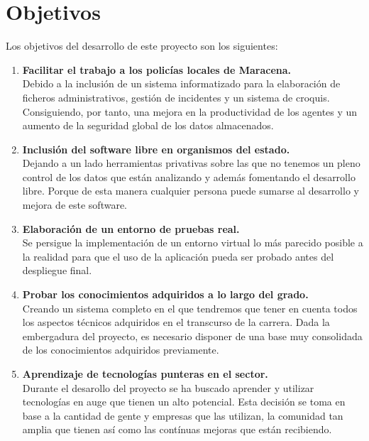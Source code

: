 \chapter{Objetivos}
Los objetivos del desarrollo de este proyecto son los siguientes:
\begin{enumerate}
    \item \textbf{Facilitar el trabajo a los policías locales de Maracena.}\\
    Debido a la inclusión de un sistema informatizado para la elaboración de 
    ficheros administrativos, gestión de incidentes y un sistema de croquis. Consiguiendo,
    por tanto, una mejora en la productividad de los agentes y un aumento de la seguridad
    global de los datos almacenados.
    
    \item \textbf{Inclusión del software libre en organismos del estado.}\\
    Dejando a un lado herramientas privativas sobre las que no tenemos un pleno control
    de los datos que están analizando y además fomentando el desarrollo libre. Porque 
    de esta manera cualquier persona puede sumarse al desarrollo y mejora de este software.

    \item \textbf{Elaboración de un entorno de pruebas real.}\\
    Se persigue la implementación de un entorno virtual lo más parecido posible a la 
    realidad para que el uso de la aplicación pueda ser probado antes del despliegue 
    final. 
   
    \item \textbf{Probar los conocimientos adquiridos a lo largo del grado.}\\
    Creando un sistema completo en el que tendremos que tener en cuenta todos los 
    aspectos técnicos adquiridos en el transcurso de la carrera. Dada la embergadura del
    proyecto, es necesario disponer de una base muy consolidada de los conocimientos adquiridos
    previamente.

    \item \textbf{Aprendizaje de tecnologías punteras en el sector.}\\
    Durante el desarollo del proyecto se ha buscado aprender y utilizar tecnologías en 
    auge que tienen un alto potencial. Esta decisión se toma en base  a la cantidad de gente
    y empresas que las utilizan, la comunidad tan amplia que tienen así como las contínuas
    mejoras que están recibiendo.  

\end{enumerate}
